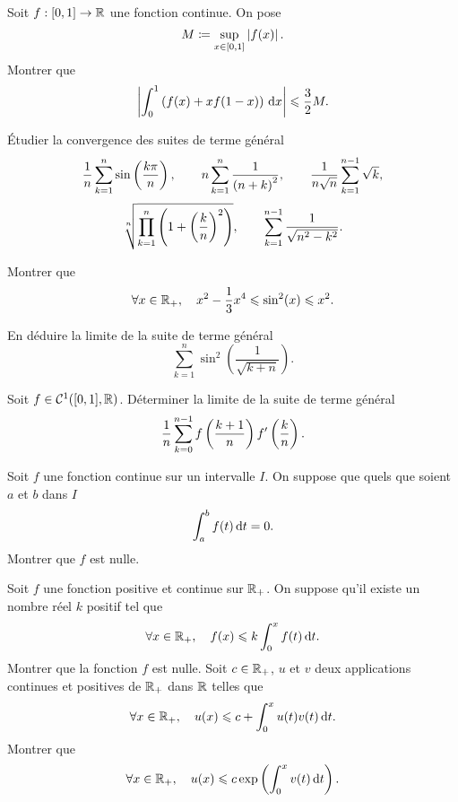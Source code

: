 \documentclass{magnolia}
\begin{document}
Soit $f:[0,1]\to\mathbb{R}$ une fonction continue. On pose
\[M\coloneqq \sup_{x\in[0,1]} \left|f(x)\right|.\]
Montrer que
\[\left|\int_{0}^{1} \left(f(x)+x f(1-x)\right)\,\text{d}x\right|\leqslant \frac{3}{2}M.\]


Étudier la convergence des suites de terme général
\[\frac{1}{n}\sum_{k=1}^n \sin\left(\frac{k\pi}{n}\right), \qquad
  n\sum_{k=1}^n \frac{1}{\left(n+k\right)^2}, \qquad
  \frac{1}{n\sqrt{n}}\sum_{k=1}^{n-1} \sqrt{k},\]
\[\sqrt[n]{\prod_{k=1}^n \left(1+\left(\frac{k}{n}\right)^2\right)}, \qquad
  \sum_{k=1}^{n-1} \frac{1}{\sqrt{n^2-k^2}}.\]

\begin{questions}
\question Montrer que
  \[\forall x \in\mathbb{R}_+ ,\quad x^2-\frac 13 x^4 \leqslant \sin^2( x)\leqslant x^2.\]
\item En déduire la limite de la suite de terme général
  \[\sum\limits_{k=1}^n \sin^2 \left(\frac 1{\sqrt{k+n}} \right).\]
\end{questions}

Soit $f \in\mathcal{C}^{1}([0,1],\mathbb{R})$. Déterminer la limite de la suite de terme général
\[\frac 1n \sum\limits_{k=0}^{n-1} f\left(\frac{k+1}n\right) f'\left(\frac kn\right).\]


Soit $f$ une fonction continue sur un intervalle $I$. On suppose que
quels que soient $a$ et $b$ dans $I$
\[\int_{a}^{b} f(t)\,\text{d}t=0.\]
Montrer que $f$ est nulle.

\begin{questions}
\question Soit $f$ une fonction positive et continue sur $\mathbb{R}_+$. On suppose
  qu'il existe un nombre réel $k$ positif tel que
  \[\forall x \in\mathbb{R}_+ ,\quad f(x) \leqslant k\int_{0}^{x} f(t)\,\text{d}t.\]
  Montrer que la fonction $f$ est nulle.
\question Soit $c\in\mathbb{R}_+$, $u$ et $v$ deux applications continues et positives
  de $\mathbb{R}_+$ dans $\mathbb{R}$ telles que
  \[\forall x\in\mathbb{R}_+ ,\quad u(x)\leqslant c+\int_{0}^{x} u(t)v(t)\,\text{d}t.\]
  Montrer que
  \[\forall x \in\mathbb{R}_+ ,\quad u(x)\leqslant c\exp\left(\int_{0}^{x} v(t)\,\text{d}t\right).\]
\end{questions}
\end{document}
